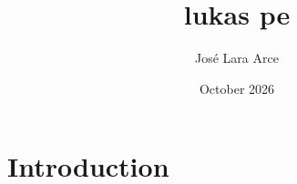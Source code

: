 \documentclass{article}
\title{lukas pe}
\author{José Lara Arce}
\date{October 2026}
\begin{document}
\maketitle

\section{Introduction}
\end{document}
